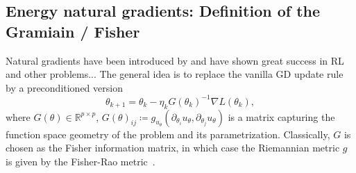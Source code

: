 \subsection{Energy natural gradients: Definition of the Gramiain / Fisher}


Natural gradients have been introduced by \citet{amari2000natural} and have shown great success in RL and other problems...
The general idea is to replace the vanilla GD update rule by a preconditioned version
    \[ \theta_{k+1} = \theta_k - \eta_k G(\theta_k)^{-1} \nabla L(\theta_k), \]
where $G(\theta)\in\mathbb R^{p\times p}$, $G(\theta)_{ij} \coloneqq g_{u_\theta}(\partial_{\theta_i} u_\theta, \partial_{\theta_j} u_\theta)$ is a matrix capturing the function space geometry of the problem and its parametrization.
Classically, $G$ is chosen as the Fisher information matrix, 
in which case the Riemannian metric $g$ is given by the Fisher-Rao metric~\cite[text]{keylist}. 

